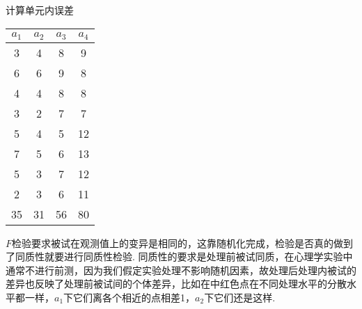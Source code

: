 \begin{margintable}
	\centering
	\caption{计算单元内误差}
	{
		\begin{tabular}{cccc}
			\toprule
    			     $a_1$ &  $a_2$ &  $a_3$ &  $a_4$ \\
    			     \midrule
                            \rowcolor[rgb]{ .949,  .949,  .949} 3     & \cellcolor[rgb]{ .867,  .922,  .969}4 & \cellcolor[rgb]{ .886,  .937,  .855}8 & \cellcolor[rgb]{ .988,  .894,  .839}9 \\
                            \rowcolor[rgb]{ .949,  .949,  .949} 6     & \cellcolor[rgb]{ .867,  .922,  .969}6 & \cellcolor[rgb]{ .886,  .937,  .855}9 & \cellcolor[rgb]{ .988,  .894,  .839}8 \\
                            \rowcolor[rgb]{ .949,  .949,  .949} 4     & \cellcolor[rgb]{ .867,  .922,  .969}4 & \cellcolor[rgb]{ .886,  .937,  .855}8 & \cellcolor[rgb]{ .988,  .894,  .839}8 \\
                            \rowcolor[rgb]{ .949,  .949,  .949} 3     & \cellcolor[rgb]{ .867,  .922,  .969}2 & \cellcolor[rgb]{ .886,  .937,  .855}7 & \cellcolor[rgb]{ .988,  .894,  .839}7 \\
                            \rowcolor[rgb]{ .949,  .949,  .949} 5     & \cellcolor[rgb]{ .867,  .922,  .969}4 & \cellcolor[rgb]{ .886,  .937,  .855}5 & \cellcolor[rgb]{ .988,  .894,  .839}12 \\
                            \rowcolor[rgb]{ .949,  .949,  .949} 7     & \cellcolor[rgb]{ .867,  .922,  .969}5 & \cellcolor[rgb]{ .886,  .937,  .855}6 & \cellcolor[rgb]{ .988,  .894,  .839}13 \\
                            \rowcolor[rgb]{ .949,  .949,  .949} 5     & \cellcolor[rgb]{ .867,  .922,  .969}3 & \cellcolor[rgb]{ .886,  .937,  .855}7 & \cellcolor[rgb]{ .988,  .894,  .839}12 \\
                            \rowcolor[rgb]{ .949,  .949,  .949} 2     & \cellcolor[rgb]{ .867,  .922,  .969}3 & \cellcolor[rgb]{ .886,  .937,  .855}6 & \cellcolor[rgb]{ .988,  .894,  .839}11 \\
                            \midrule
                            35 & 31 &  56 & 80\\
                        \bottomrule
		\end{tabular}
	}
\end{margintable}

$F$检验要求被试在观测值上的变异是相同的，这靠随机化完成，检验是否真的做到了同质性就要进行同质性检验.
同质性的要求是处理前被试同质，在心理学实验中通常不进行前测，因为我们假定实验处理不影响随机因素，故处理后处理内被试的差异也反映了处理前被试间的个体差异，比如在中红色点在不同处理水平的分散水平都一样，$a_1$下它们离各个相近的点相差1，$a_2$下它们还是这样.

